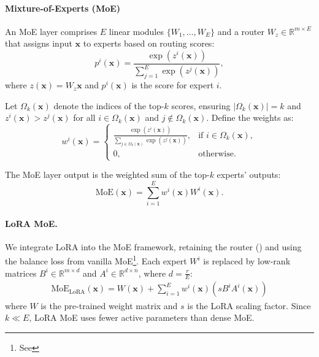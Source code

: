 \paragraph{Mixture-of-Experts (MoE)} An MoE layer \cite{qu2024llama,zhu2024dynamic,zhu2024llama,zhang2024clip} comprises $E$ linear modules $\{W_{1}, \dots, W_{E}\}$ and a router $W_z \in \mathbb{R}^{m \times E}$ that assigns input $\mathbf{x}$ to experts based on routing scores:
\begin{equation}
    p^i(\mathbf{x}) = \frac{\exp(z^i(\mathbf{x}))}{\sum_{j=1}^{E} \exp(z^j(\mathbf{x}))},
\end{equation}
where $z(\mathbf{x}) = W_z \mathbf{x}$ and $p^i(\mathbf{x})$ is the score for expert $i$.

Let $\Omega_k(\mathbf{x})$ denote the indices of the top-$k$ scores, ensuring $|\Omega_k(\mathbf{x})| = k$ and $z^i(\mathbf{x}) > z^j(\mathbf{x})$ for all $i \in \Omega_k(\mathbf{x})$ and $j \notin \Omega_k(\mathbf{x})$. Define the weights as:
\begin{equation}
    w^i(\mathbf{x}) = 
    \begin{cases} 
        \frac{\exp(z^i(\mathbf{x}))}{\sum_{j \in \Omega_k(\mathbf{x})} \exp(z^j(\mathbf{x}))}, & \text{if } i \in \Omega_k(\mathbf{x}), \\
        0, & \text{otherwise}.
    \end{cases}
    \label{eq:router}
\end{equation}

The MoE layer output is the weighted sum of the top-$k$ experts' outputs:
\begin{equation}
    \mathrm{MoE}(\mathbf{x}) = \sum_{i=1}^E w^i(\mathbf{x}) W^i(\mathbf{x}).
    \label{eq:moe}
\end{equation}

\paragraph{LoRA MoE.} We integrate LoRA into the MoE framework, retaining the router () and using the balance loss from vanilla MoE\footnote{See }. Each expert $W^i$ is replaced by low-rank matrices $B^i \in \mathbb{R}^{m \times d}$ and $A^i \in \mathbb{R}^{d \times n}$, where $d = \frac{r}{E}$:
\begin{align}
    \mathrm{MoE}_{\text{LoRA}}(\mathbf{x}) = W(\mathbf{x}) + \sum_{i=1}^E w^i(\mathbf{x}) \left( s B^i A^i (\mathbf{x}) \right) \label{eq:moe_lora} 
\end{align}
where $W$ is the pre-trained weight matrix and $s$ is the LoRA scaling factor. Since $k \ll E$, LoRA MoE uses fewer active parameters than dense MoE. 

